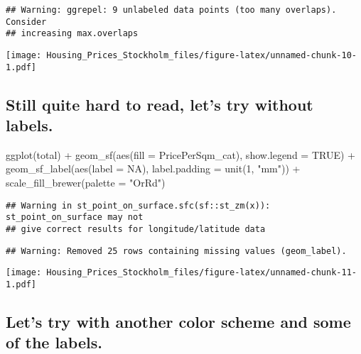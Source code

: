 \documentclass[
]{article}
\newenvironment{Shaded}{\begin{snugshade}}{\end{snugshade}}
\newcommand{\AttributeTok}[1]{\textcolor[rgb]{0.77,0.63,0.00}{#1}}
\newcommand{\ConstantTok}[1]{\textcolor[rgb]{0.00,0.00,0.00}{#1}}
\newcommand{\DecValTok}[1]{\textcolor[rgb]{0.00,0.00,0.81}{#1}}
\newcommand{\FunctionTok}[1]{\textcolor[rgb]{0.00,0.00,0.00}{#1}}
\newcommand{\NormalTok}[1]{#1}
\newcommand{\SpecialCharTok}[1]{\textcolor[rgb]{0.00,0.00,0.00}{#1}}
\newcommand{\StringTok}[1]{\textcolor[rgb]{0.31,0.60,0.02}{#1}}
\begin{document}
\begin{verbatim}
## Warning: ggrepel: 9 unlabeled data points (too many overlaps). Consider
## increasing max.overlaps
\end{verbatim}

\texttt{[image: Housing\_Prices\_Stockholm\_files/figure-latex/unnamed-chunk-10-1.pdf]}

\hypertarget{still-quite-hard-to-read-lets-try-without-labels.}{%
\subsection{Still quite hard to read, let's try without
labels.}\label{still-quite-hard-to-read-lets-try-without-labels.}}

\begin{Shaded}
\begin{Highlighting}[]
\FunctionTok{ggplot}\NormalTok{(total) }\SpecialCharTok{+} 
  \FunctionTok{geom\_sf}\NormalTok{(}\FunctionTok{aes}\NormalTok{(}\AttributeTok{fill =}\NormalTok{ PricePerSqm\_cat), }\AttributeTok{show.legend =} \ConstantTok{TRUE}\NormalTok{) }\SpecialCharTok{+} 
  \FunctionTok{geom\_sf\_label}\NormalTok{(}\FunctionTok{aes}\NormalTok{(}\AttributeTok{label =} \ConstantTok{NA}\NormalTok{), }\AttributeTok{label.padding =} \FunctionTok{unit}\NormalTok{(}\DecValTok{1}\NormalTok{, }\StringTok{"mm"}\NormalTok{)) }\SpecialCharTok{+}
  \FunctionTok{scale\_fill\_brewer}\NormalTok{(}\AttributeTok{palette =} \StringTok{"OrRd"}\NormalTok{)}
\end{Highlighting}
\end{Shaded}

\begin{verbatim}
## Warning in st_point_on_surface.sfc(sf::st_zm(x)): st_point_on_surface may not
## give correct results for longitude/latitude data
\end{verbatim}

\begin{verbatim}
## Warning: Removed 25 rows containing missing values (geom_label).
\end{verbatim}

\texttt{[image: Housing\_Prices\_Stockholm\_files/figure-latex/unnamed-chunk-11-1.pdf]}

\hypertarget{lets-try-with-another-color-scheme-and-some-of-the-labels.}{%
\subsection{Let's try with another color scheme and some of the
labels.}\label{lets-try-with-another-color-scheme-and-some-of-the-labels.}}
\end{document}
